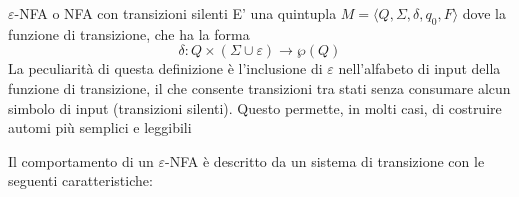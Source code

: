 \documentclass[12pt, a4paper]{report}
\begin{document}
                \begin{definitionbox}{$\varepsilon$-NFA o NFA con transizioni silenti}{}
                    E' una quintupla $M = \langle Q, \Sigma, \delta, q_0, F \rangle$ dove la funzione di transizione, che ha la forma \begin{equation*}
                        \delta : Q \times (\Sigma \cup {\varepsilon}) \to \wp(Q)
                    \end{equation*}
                    La peculiarità di questa definizione è l'inclusione di $\varepsilon$ nell'alfabeto di input della funzione di transizione, il che consente transizioni tra stati senza consumare alcun simbolo di input (transizioni silenti). Questo permette, in molti casi, di costruire automi più semplici e leggibili
                \end{definitionbox}
                Il comportamento di un $\varepsilon$-NFA è descritto da un sistema di transizione con le seguenti caratteristiche:
\end{document}
